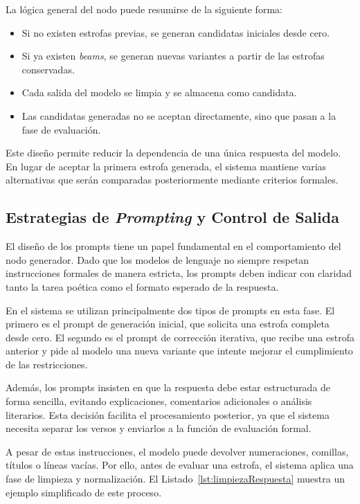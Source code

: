 \documentclass[12pt,a4paper,twoside,openright]{book}
\begin{document}
La lógica general del nodo puede resumirse de la siguiente forma:

\begin{itemize}
\item Si no existen estrofas previas, se generan candidatas iniciales desde cero.
\item Si ya existen \emph{beams}, se generan nuevas variantes a partir de las estrofas conservadas.
\item Cada salida del modelo se limpia y se almacena como candidata.
\item Las candidatas generadas no se aceptan directamente, sino que pasan a la fase de evaluación.
\end{itemize}

Este diseño permite reducir la dependencia de una única respuesta del modelo. En lugar de aceptar la primera estrofa generada, el sistema mantiene varias alternativas que serán comparadas posteriormente mediante criterios formales.


\subsection{Estrategias de \emph{Prompting} y Control de Salida}

El diseño de los prompts tiene un papel fundamental en el comportamiento del nodo generador. Dado que los modelos de lenguaje no siempre respetan instrucciones formales de manera estricta, los prompts deben indicar con claridad tanto la tarea poética como el formato esperado de la respuesta.

En el sistema se utilizan principalmente dos tipos de prompts en esta fase. El primero es el prompt de generación inicial, que solicita una estrofa completa desde cero. El segundo es el prompt de corrección iterativa, que recibe una estrofa anterior y pide al modelo una nueva variante que intente mejorar el cumplimiento de las restricciones.

Además, los prompts insisten en que la respuesta debe estar estructurada de forma sencilla, evitando explicaciones, comentarios adicionales o análisis literarios. Esta decisión facilita el procesamiento posterior, ya que el sistema necesita separar los versos y enviarlos a la función de evaluación formal.

A pesar de estas instrucciones, el modelo puede devolver numeraciones, comillas, títulos o líneas vacías. Por ello, antes de evaluar una estrofa, el sistema aplica una fase de limpieza y normalización. El Listado~\ref{lst:limpiezaRespuesta} muestra un ejemplo simplificado de este proceso.
\end{document}
